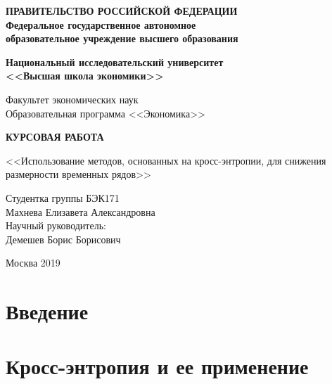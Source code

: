 \documentclass[a4paper, 12pt]{article}
\begin{document}
\thispagestyle{empty}
\begin{center}
	\textbf{ПРАВИТЕЛЬСТВО РОССИЙСКОЙ ФЕДЕРАЦИИ}\\
	\vspace{3ex}
	\textbf{Федеральное государственное автономное\\ образовательное учреждение высшего образования}
	
	\vspace{3ex}
	
	\textbf{Национальный исследовательский университет \\ <<Высшая школа экономики>>}
	
	\vspace{10ex}
	\begin{flushright}
		Факультет экономических наук\\
		Образовательная программа <<Экономика>>
	\end{flushright}
\end{center}
\vspace{12ex}

\begin{center}
	{\textbf{КУРСОВАЯ РАБОТА
	}}
	\vspace{1ex}
	
	<<Использование методов, основанных на кросс-энтропии, для снижения размерности временных рядов>>
\end{center}
\vspace{4ex}
\begin{flushright}
	\noindent
	Студентка группы БЭК171\\Махнева Елизавета Александровна\\
	\vspace{13ex}
	Научный руководитель:\\
	Демешев Борис Борисович
	
\end{flushright}	

\vfill

\begin{center}
	Москва 2019
	
\end{center}
\newpage
	\tableofcontents
	\newpage
	
	\section{Введение}
	
	\newpage
	
	\section{Кросс-энтропия и ее применение}
\end{document}
